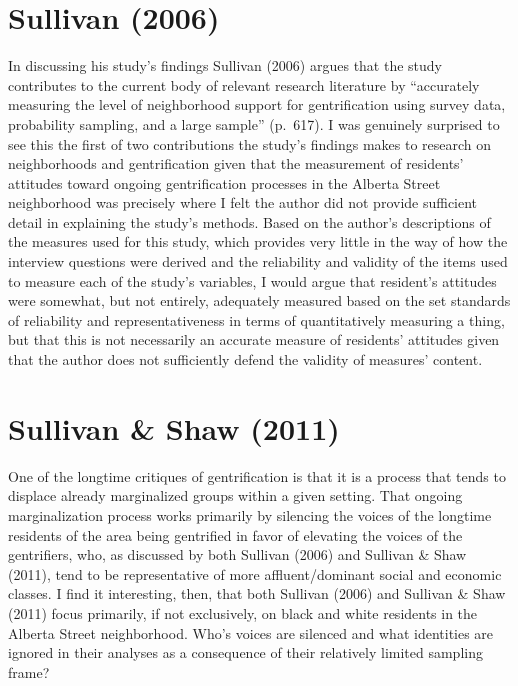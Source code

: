 \documentclass[11pt,]{tufte-handout}
\begin{document}
\section{Sullivan (2006)}\label{sullivan2006assessing}

In discussing his study's findings Sullivan (2006) argues that the study
contributes to the current body of relevant research literature by
``accurately measuring the level of neighborhood support for
gentrification using survey data, probability sampling, and a large
sample'' (p.~617). I was genuinely surprised to see this the first of
two contributions the study's findings makes to research on
neighborhoods and gentrification given that the measurement of
residents' attitudes toward ongoing gentrification processes in the
Alberta Street neighborhood was precisely where I felt the author did
not provide sufficient detail in explaining the study's methods. Based
on the author's descriptions of the measures used for this study, which
provides very little in the way of how the interview questions were
derived and the reliability and validity of the items used to measure
each of the study's variables, I would argue that resident's attitudes
were somewhat, but not entirely, adequately measured based on the set
standards of reliability and representativeness in terms of
quantitatively measuring a thing, but that this is not necessarily an
accurate measure of residents' attitudes given that the author does not
sufficiently defend the validity of measures' content.

\section{Sullivan \& Shaw (2011)}\label{sullivan2011retail}

One of the longtime critiques of gentrification is that it is a process
that tends to displace already marginalized groups within a given
setting. That ongoing marginalization process works primarily by
silencing the voices of the longtime residents of the area being
gentrified in favor of elevating the voices of the gentrifiers, who, as
discussed by both Sullivan (2006) and Sullivan \& Shaw (2011), tend to
be representative of more affluent/dominant social and economic classes.
I find it interesting, then, that both Sullivan (2006) and Sullivan \&
Shaw (2011) focus primarily, if not exclusively, on black and white
residents in the Alberta Street neighborhood. Who's voices are silenced
and what identities are ignored in their analyses as a consequence of
their relatively limited sampling frame?
\end{document}
